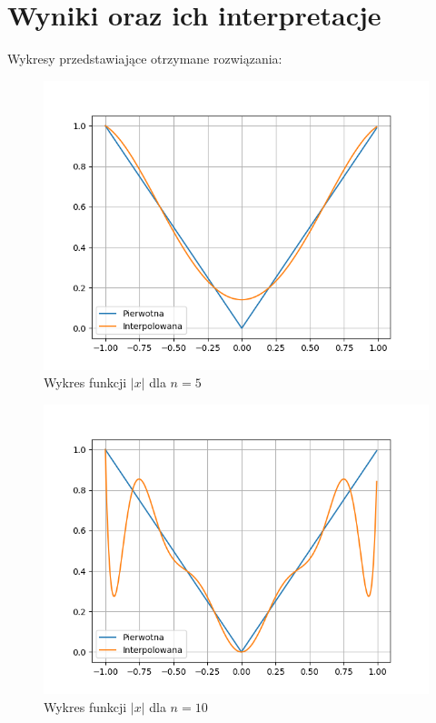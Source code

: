\documentclass[a4paper,14pt]{report}
\begin{document}
  \section{Wyniki oraz ich interpretacje}
    Wykresy przedstawiające otrzymane rozwiązania:
    \begin{figure}[H]
      \includegraphics[scale=0.75]{c-5}
      \centering
      \caption{Wykres funkcji $|x|$ dla $n=5$}
    \end{figure}
    \begin{figure}[H]
      \includegraphics[scale=0.75]{c-10}
      \centering
      \caption{Wykres funkcji $|x|$ dla $n=10$}
    \end{figure}
\end{document}
